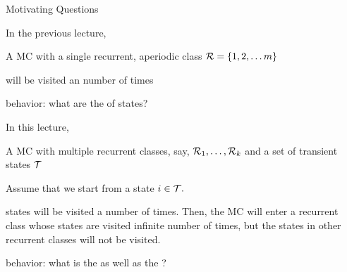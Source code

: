 \begin{frame}{Motivating Questions}

  \plitemsep 0.07in

\bci

\item In the previous lecture, 
  \bci
\item<2-> A MC with a single recurrent, aperiodic class $\mathcal R=\{1, 2,
    \ldots m\}$

\item<3->  will be visited an  number of times

\item<4->[\redf{(Q)}]  behavior: what are the
   of states?
  
  \eci

\item In this lecture, 

  \bci
\item<5-> A MC with multiple recurrent classes, say, $\mathcal R_1,
\ldots, \mathcal R_k$ and a set of transient states $\mathcal T$

\item<6-> Assume that we start from a state $i \in \mathcal T.$

\item<7-> 
  states will be visited a  number of times. Then, the MC
  will enter a recurrent class whose states are visited infinite
  number of times, but the states in other recurrent classes will not
  be visited.  

\item<8->[\redf{(Q)}]  behavior: what is the  as
  well as the ?

  \eci

  \eci 

\end{frame}

